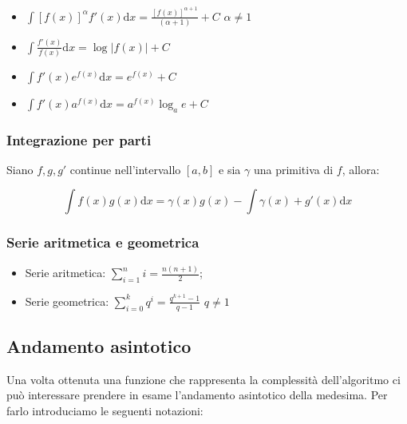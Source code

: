 \begin{itemize}

\item $\int[f(x)]^\alpha f'(x) \mathrm{d}x=\frac{[f(x)]^{\alpha+1}}{(\alpha+1)}+C$ \hfill $\alpha \neq 1$
\item $\int \frac{f'(x)}{f(x)}\mathrm{d}x=\log |f(x)|+C$
\item $\int f'(x)e^{f(x)}\mathrm{d}x=e^{f(x)}+C$
\item $\int f'(x)a^{f(x)}\mathrm{d}x=a^{f(x)}\log_ae+C$

\end{itemize}

\subsubsection{Integrazione per parti}

Siano $f, g, g'$ continue nell'intervallo $[a,b]$ e sia $\gamma$ una primitiva di $f$, allora:

$$\int f(x)g(x)\mathrm{d}x=\gamma(x)g(x)-\int\gamma(x)+g'(x)\mathrm{d}x$$

\subsubsection{Serie aritmetica e geometrica}

\begin{itemize}

\item Serie aritmetica: $\sum_{i=1}^n i = \frac{n(n+1)}{2}$;
\item Serie geometrica: $\sum_{i=0}^k q^i = \frac{q^{k+1}-1}{q-1}$ \hfill $q\neq1$

\end{itemize}

\subsection{Andamento asintotico}

Una volta ottenuta una funzione che rappresenta la complessità dell'algoritmo ci può interessare prendere in esame l'andamento asintotico della medesima. Per farlo introduciamo le seguenti notazioni:

